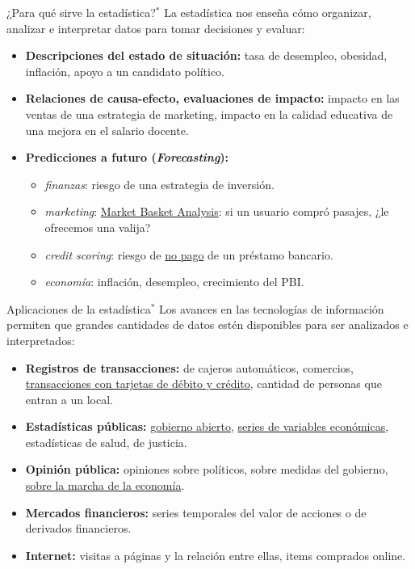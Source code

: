 \documentclass{beamer}
\theoremstyle{definition}
\begin{document}
\begin{frame}{\color{rosee}¿Para qué sirve la estadística?${}^*$}
  La estad\'istica nos enseña c\'omo organizar, analizar e interpretar
  datos para tomar decisiones y evaluar:
  \begin{itemize}
  \item \textbf{Descripciones del estado de situaci\'on:} tasa de
    desempleo, obesidad, inflaci\'on, apoyo a un candidato pol\'itico.
  \item \textbf{Relaciones de causa-efecto, evaluaciones de impacto:}
    impacto en las ventas de una estrategia de marketing, impacto en la
    calidad educativa de una mejora en el salario docente.
  \item \textbf{Predicciones a futuro (\textit{Forecasting}):}
    \begin{itemize}
    \item \textit{finanzas}: riesgo de una estrategia de inversi\'on.
    \item \textit{marketing}:
      \href{https://www.forbes.com/sites/kashmirhill/2012/02/16/how-target-figured-out-a-teen-girl-was-pregnant-before-her-father-did/\#3aa2c45c6668}{Market Basket Analysis}: si un usuario compr\'o pasajes, ¿le ofrecemos una valija?
    \item \textit{credit scoring}: riesgo de
      \href{https://www.kaggle.com/c/GiveMeSomeCredit}{no pago} de un
      pr\'estamo bancario.
    \item \textit{econom\'ia}: inflaci\'on, desempleo, crecimiento del PBI.
    \end{itemize}
  \end{itemize}
\end{frame}

\begin{frame}{\color{rosee} Aplicaciones de la estadística${}^*$}
  Los avances en las tecnolog\'ias de informaci\'on permiten que grandes
  cantidades de datos est\'en disponibles para ser analizados e
  interpretados:
\begin{itemize}
\item \textbf{Registros de transacciones:} de cajeros autom\'aticos,
  comercios,
  \href{https://www.kaggle.com/mlg-ulb/creditcardfraud}{transacciones
    con tarjetas de d\'ebito y cr\'edito}, cantidad de personas que
  entran a un local.
\item \textbf{Estad\'isticas públicas:}
  \href{https://data.buenosaires.gob.ar/}{gobierno abierto},
  \href{https://www.indec.gob.ar/indec/web/Institucional-Indec-BasesDeDatos}{series
    de variables econ\'omicas}, estad\'isticas de salud, de justicia.
\item \textbf{Opini\'on pública:} opiniones sobre pol\'iticos, sobre
  medidas del gobierno,
  \href{https://www.utdt.edu/ver_contenido.php?id_contenido=2575\&id_item_menu=4982}{sobre
    la marcha de la econom\'ia}.
\item \textbf{Mercados financieros:} series temporales del valor de
  acciones o de derivados financieros.
\item \textbf{Internet:} visitas a p\'aginas y la relaci\'on entre
  ellas, items comprados online.
\end{itemize}
\end{frame}
\end{document}

